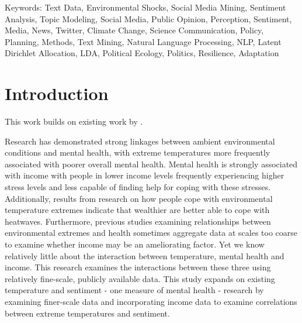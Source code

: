 \documentclass{article}
\begin{document}
Keywords: Text Data, Environmental Shocks, Social Media Mining, Sentiment Analysis, Topic Modeling, Social Media, Public Opinion, Perception, Sentiment, Media, News, Twitter, Climate Change, Science Communication, Policy, Planning, Methods, Text Mining, Natural Language Processing, NLP, Latent Dirichlet Allocation, LDA, Political Ecology, Politics, Resilience, Adaptation

    

\section{Introduction}



This work builds on existing work by \citep{baylis_weather_2018}. 

Research has demonstrated strong linkages between ambient environmental conditions and mental health, with extreme temperatures more frequently associated with poorer overall mental health. Mental health is strongly associated with income with people in lower income levels frequently experiencing higher stress levels and less capable of finding help for coping with these stresses. Additionally, results from research on how people cope with environmental temperature extremes indicate that wealthier are better able to cope with heatwaves. Furthermore, previous studies examining relationships between environmental extremes and health sometimes aggregate data at scales too coarse to examine whether income may be an ameliorating factor. Yet we know relatively little about the interaction between temperature, mental health and income. This research examines the interactions between these three using relatively fine-scale, publicly available data. This study expands on existing temperature and sentiment - one measure of mental health - research by examining finer-scale data and incorporating income data to examine correlations between extreme temperatures and sentiment.
\end{document}
